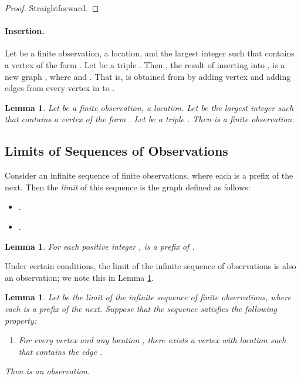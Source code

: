 \documentclass[11pt]{article}
\numberwithin{theorem}{section}
\newtheorem{lemma}[theorem]{Lemma}
\begin{document}
\begin{proof}
Straightforward.
\end{proof}





\paragraph{Insertion.}
Let  be a finite observation,  a location, and  the
largest integer such that  contains a vertex of the form .
Let  be a triple .
Then , the result of inserting  into , is a new graph 
, where  and 
. 
That is,  is obtained from  by adding vertex  and adding
edges from every vertex in  to .



\begin{lemma}
\label{prop:insertVertexYeildsObservation}
Let  be a finite observation,  a location.
Let  be the largest integer such that  contains a vertex of the
form .
Let  be a triple .
Then  is a finite observation.
\end{lemma}

\subsection{Limits of Sequences of Observations}

Consider an infinite sequence  of finite observations,
where each is a prefix of the next.
Then the \emph{limit} of this sequence is the graph  defined as follows:
\begin{itemize}
\item
.
\item
.
\end{itemize}

\begin{lemma}\label{lem:GxIsPrefixOfGInfty}
For each positive integer , 
 is a prefix of .
\end{lemma}

Under certain conditions, the limit of the infinite sequence of observations  is also an observation; we note this in Lemma  \ref{lem:obs:limitObs}.
\begin{lemma}
\label{lem:obs:limitObs}
Let  be the limit of the infinite sequence  of finite observations,
where each is a prefix of the next.
Suppose that the sequence satisfies the following property:
\begin{enumerate}
\item
For every vertex  and any location ,
there exists a vertex  with location
 such that   contains the edge .
\end{enumerate}
Then  is an observation.
\end{lemma}
\end{document}
